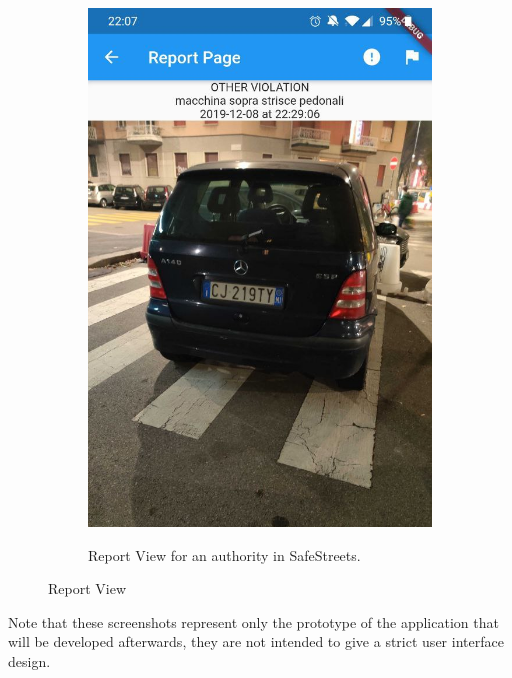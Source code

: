 \documentclass[../RASD.tex]{subfiles}
\begin{document}
\begin{figure}[H]
\begin{subfigure}{.5\textwidth}
            \includegraphics[scale = 0.2]{assets/app_screenshots/authorityReport.png}\\
            \caption[\textit{View Report Authority} Screenshot]{Report View for an authority in SafeStreets.}
            \label{fig:sub2}
        \end{subfigure}
        \label{fig:test}
        \caption[\textit{View Report} Screenshots]{Report View}
    \end{figure}

    Note that these screenshots represent only the prototype of the application that will be developed afterwards, they are not intended
    to give a strict user interface design.
\end{document}
